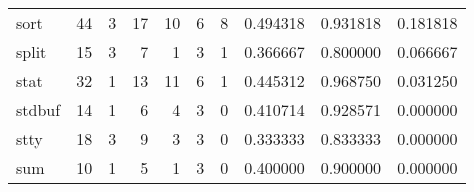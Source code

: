 \begin{tabular}{lrrrrrrrrr}
sort      &                                       44 &                                                  3 &                                                 17 &                                                 10 &                                                  6 &                                                  8 &                                           0.494318 &                               0.931818 &                             0.181818 \\
split     &                                       15 &                                                  3 &                                                  7 &                                                  1 &                                                  3 &                                                  1 &                                           0.366667 &                               0.800000 &                             0.066667 \\
stat      &                                       32 &                                                  1 &                                                 13 &                                                 11 &                                                  6 &                                                  1 &                                           0.445312 &                               0.968750 &                             0.031250 \\
stdbuf    &                                       14 &                                                  1 &                                                  6 &                                                  4 &                                                  3 &                                                  0 &                                           0.410714 &                               0.928571 &                             0.000000 \\
stty      &                                       18 &                                                  3 &                                                  9 &                                                  3 &                                                  3 &                                                  0 &                                           0.333333 &                               0.833333 &                             0.000000 \\
sum       &                                       10 &                                                  1 &                                                  5 &                                                  1 &                                                  3 &                                                  0 &                                           0.400000 &                               0.900000 &                             0.000000 \\

\end{tabular}
